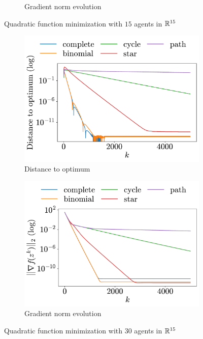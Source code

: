 \documentclass[a4paper,11pt,oneside]{book}
\begin{document}
\begin{figure}[h!]
\begin{subfigure}[h]{0.42\linewidth}
            \caption{Gradient norm evolution}
      \end{subfigure}
      \caption{Quadratic function minimization with $15$ agents in ${\mathbb{R}}^{15}$}
      \label{fig:quadratic_15_15}
\end{figure}

\begin{figure}[h!]
      \centering
      \begin{subfigure}[h]{0.42\linewidth}
            \centering
            \includegraphics[width=\linewidth]{./figs/quadratic/30_15/distance.pdf} 
            \caption{Distance to optimum}
      \end{subfigure}
      \hfill
      \begin{subfigure}[h]{0.42\linewidth}
            \centering
            \includegraphics[width=\linewidth]{./figs/quadratic/30_15/gradient.pdf} 
            \caption{Gradient norm evolution}
      \end{subfigure}
      \caption{Quadratic function minimization with $30$ agents in ${\mathbb{R}}^{15}$}
      \label{fig:quadratic_30_15}
\end{figure}
\end{document}

